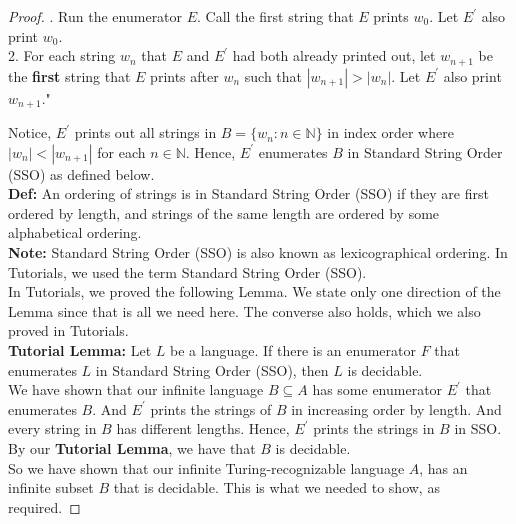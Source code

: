 \documentclass[12pt]{article}
\newcommand{\N}{\mathbb{N}}
\begin{document}
\begin{proof}
\setlength\parindent{15pt}

. Run the enumerator $E$. Call the first string that $E$ prints $w_0$. Let $E^\prime$ also print $w_0$. \\

2. For each string $w_n$ that $E$ and $E^\prime$ had both already printed out, let $w_{n+1}$ be the \textbf{first} string that $E$ prints after $w_n$ such that $|w_{n+1}| > |w_n|$. Let $E^\prime$ also print $w_{n+1}$." \\

\setlength\parindent{0pt}

Notice, $E^\prime$ prints out all strings in $B = \{w_n: n \in \N\}$ in index order where $|w_n| < |w_{n+1}|$ for each $n \in \N$. Hence, $E^\prime$ enumerates $B$ in Standard String Order (SSO) as defined below. \\

\textbf{Def:} An ordering of strings is in Standard String Order (SSO) if they are first ordered by length, and strings of the same length are ordered by some alphabetical ordering. \\

\textbf{Note:} Standard String Order (SSO) is also known as lexicographical ordering. In Tutorials, we used the term Standard String Order (SSO). \\

In Tutorials, we proved the following Lemma. We state only one direction of the Lemma since that is all we need here. The converse also holds, which we also proved in Tutorials. \\

\textbf{Tutorial Lemma:} Let $L$ be a language. If there is an enumerator $F$ that enumerates $L$ in Standard String Order (SSO), then $L$ is decidable. \\

We have shown that our infinite language $B \subseteq A$ has some enumerator $E^\prime$ that enumerates $B$. And $E^\prime$ prints the strings of $B$ in increasing order by length. And every string in $B$ has different lengths. Hence, $E^\prime$ prints the strings in $B$ in SSO. By our \textbf{Tutorial Lemma}, we have that $B$ is decidable. \\

So we have shown that our infinite Turing-recognizable language $A$, has an infinite subset $B$ that is decidable. This is what we needed to show, as required. 
\end{proof}
\end{document}
